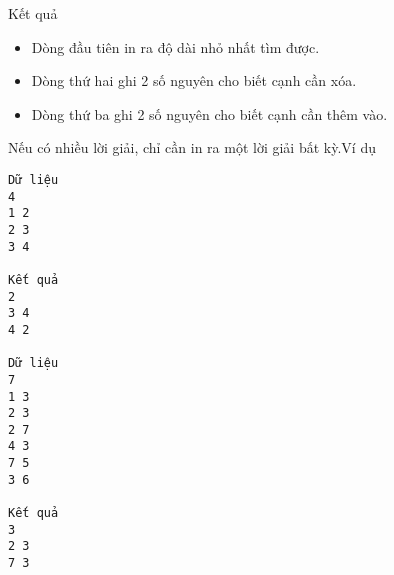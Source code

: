 Kết quả
\begin{itemize}
	\item     Dòng đầu tiên in ra độ dài nhỏ nhất tìm được.   
	\item     Dòng thứ hai ghi 2 số nguyên cho biết cạnh cần xóa.   
	\item     Dòng thứ ba ghi 2 số nguyên cho biết cạnh cần thêm   vào.   
\end{itemize}

   Nếu có nhiều lời giải, chỉ cần in ra một lời giải bất kỳ.Ví dụ  
\begin{verbatim}
Dữ liệu
4
1 2
2 3
3 4

Kết quả
2
3 4
4 2

Dữ liệu
7
1 3
2 3
2 7
4 3
7 5
3 6

Kết quả
3
2 3
7 3
\end{verbatim}